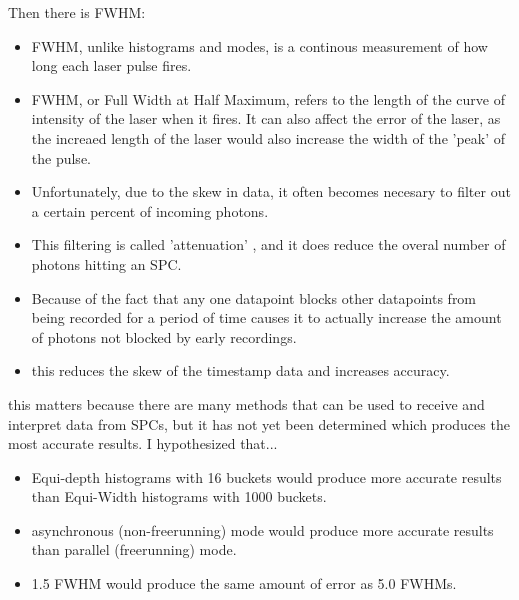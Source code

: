 \documentclass[aspectratio=169]{beamer}
\begin{document}
\begin{frame}
  Then there is FWHM:
  \begin{itemize}
    \color{Blue}
  \item FWHM, unlike histograms and modes, is a continous measurement of how long each laser pulse fires.
  \item FWHM, or Full Width at Half Maximum, refers to the length of the curve of intensity of the laser when it fires. It can also affect the error of the laser, as the increaed length of the laser would also increase the width of the 'peak' of the pulse.
  \end{itemize}
\end{frame}

\begin{frame}
  \begin{itemize}
    \color{Blue}
  \item Unfortunately, due to the skew in data, it often becomes necesary to filter out a certain percent of incoming photons.
  \item This filtering is called 'attenuation' \cite{ingle}, and it does reduce the overal number of photons hitting an SPC.
  \item Because of the fact that any one datapoint blocks other datapoints from being recorded for a period of time causes it to actually increase the amount of photons not blocked by early recordings.
  \item this reduces the skew of the timestamp data and increases accuracy. \cite{sadekar}
  \end{itemize}
\end{frame}

\begin{frame}
  this matters because there are many methods that can be used to receive and interpret data from SPCs, but it has not yet been determined which produces the most accurate results.
  I hypothesized that...
  \begin{itemize}
    \color{Blue}
  \item Equi-depth histograms with 16 buckets would produce more accurate results than Equi-Width histograms with 1000 buckets.
  \item asynchronous (non-freerunning) mode would produce more accurate results than parallel (freerunning) mode.
  \item 1.5 FWHM would produce the same amount of error as 5.0 FWHMs.
  \end{itemize}
\end{frame}
\end{document}
